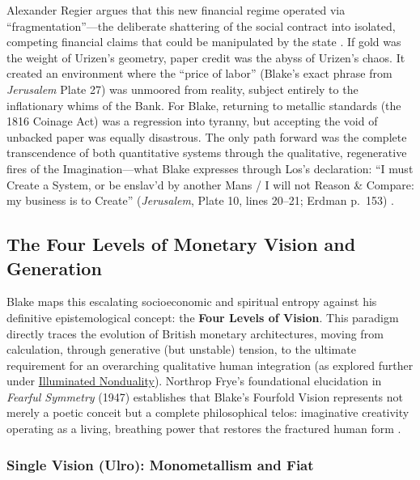 \documentclass[
]{article}
\begin{document}
Alexander Regier argues that this new financial regime operated via
``fragmentation''---the deliberate shattering of the social contract
into isolated, competing financial claims that could be manipulated by
the state \citep{regier1800lucretian}. If gold was the weight of
Urizen's geometry, paper credit was the abyss of Urizen's chaos. It
created an environment where the ``price of labor'' (Blake's exact
phrase from \emph{Jerusalem} Plate 27) was unmoored from reality,
subject entirely to the inflationary whims of the Bank. For Blake,
returning to metallic standards (the 1816 Coinage Act) was a regression
into tyranny, but accepting the void of unbacked paper was equally
disastrous. The only path forward was the complete transcendence of both
quantitative systems through the qualitative, regenerative fires of the
Imagination---what Blake expresses through Los's declaration: ``I must
Create a System, or be enslav'd by another Mans / I will not Reason \&
Compare: my business is to Create'' (\emph{Jerusalem}, Plate 10, lines
20--21; Erdman p.~153) \citep{erdman1988complete}.

\newpage

\subsection{The Four Levels of Monetary Vision and
Generation}\label{the-four-levels-of-monetary-vision-and-generation}

Blake maps this escalating socioeconomic and spiritual entropy against
his definitive epistemological concept: the \textbf{Four Levels of
Vision}. This paradigm directly traces the evolution of British monetary
architectures, moving from calculation, through generative (but
unstable) tension, to the ultimate requirement for an overarching
qualitative human integration (as explored further under
\href{04a_illuminated_nonduality.md\#illuminated-nonduality-and-the-fourfold-vision}{Illuminated
Nonduality}). Northrop Frye's foundational elucidation in \emph{Fearful
Symmetry} (1947) establishes that Blake's Fourfold Vision represents not
merely a poetic conceit but a complete philosophical telos: imaginative
creativity operating as a living, breathing power that restores the
fractured human form \citep{frye1947fearful}.

\subsubsection{Single Vision (Ulro): Monometallism and
Fiat}\label{single-vision-ulro-monometallism-and-fiat}
\end{document}

